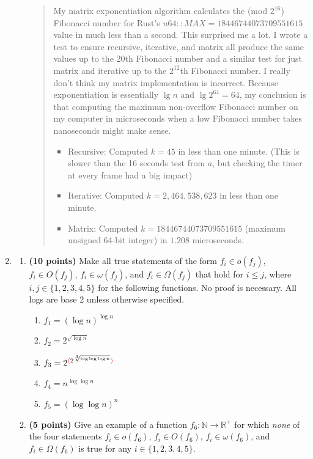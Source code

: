 \documentclass[11pt]{article}
\begin{document}
\begin{enumerate}[leftmargin=*]
\begin{enumerate}
\begin{quote}
  \medskip
  My matrix exponentiation algorithm calculates the (mod $2^16$) Fibonacci number for Rust's $u64::MAX = 18446744073709551615$ value in much less than a second. This surprised me a lot. I wrote a test to ensure recursive, iterative, and matrix all produce the same values up to the 20th Fibonacci number and a similar test for just matrix and iterative up to the $2^12$th Fibonacci number. I really don't think my matrix implementation is incorrect. Because exponentiation is essentially $\lg n$ and $\lg 2^{64} = 64$, my conclusion is that computing the maximum non-overflow Fibonacci number on my computer in microseconds when a low Fibonacci number takes nanoseconds might make sense.

  \begin{itemize}
    \item Recursive: Computed $k = 45$ in less than one minute. (This is slower than the 16 seconds test from $a$, but checking the timer at every frame had a big impact)
    \item Iterative: Computed $k = 2,464,538,623$ in less than one minute.
    \item Matrix: Computed $k = 18446744073709551615$ (maximum unsigned 64-bit integer) in $1.208$ microseconds.
  \end{itemize}

\end{quote}
\end{enumerate}


\item
\begin{enumerate}
\item
{\bf (10 points)}
Make all true statements of the form $f_i \in o(f_j)$, $f_i \in O(f_j)$, $f_i \in \omega(f_j)$, and $f_i \in \Omega(f_j)$ that hold for $i \le j$, where $i, j \in \{1,2,3,4,5\}$ for the following functions. No proof is necessary. All logs are base 2 unless otherwise specified.
\begin{enumerate}
\item $f_1 = (\log n)^{\log n}$
\item $f_2 = 2^{\sqrt{\log n}}$
\item $f_3 = 2^{{\color{red}(}2^{\sqrt[3]{\log\log\log n}}{\color{red})}}$
\item $f_4 = n^{\log\log n}$
\item $f_5 = (\log\log n)^n$
\end{enumerate}
\item
{\bf (5 points)}
Give an example of a function $f_6: \mathbb{N} \to \mathbb{R}^+$ for which \emph{none} of the four statements $f_i \in o(f_6)$, $f_i \in O(f_6)$, $f_i \in \omega(f_6)$, and $f_i \in \Omega(f_6)$ is true for any $i \in \{1,2,3,4,5\}$.
\end{enumerate}


\end{enumerate}
\end{document}
